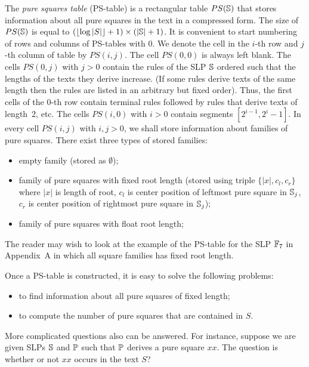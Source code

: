 ﻿\documentclass[11pt]{article}
\begin{document}
The \emph{pure squares table} (PS-table) is a rectangular table $PS(\mathbb{S})$ that stores information about all pure
squares in the text in a compressed form. The size of $PS(\mathbb{S})$ is equal to $(\lfloor\log |S|\rfloor+1) \times
(|\mathbb{S}|+1)$. It is convenient to start numbering of rows and columns of PS-tables with 0. We denote the cell in
the $i$-th row and $j$-th column of table by $PS(i,j)$. The cell $PS(0,0)$ is always left blank. The cells $PS(0,j)$
with $j>0$ contain the rules of the SLP $\mathbb{S}$ ordered such that the lengths of the texts they derive increase. (If some
rules derive texts of the same length then the rules are listed in an arbitrary but fixed order). Thus, the first cells 
of the 0-th row contain terminal rules followed by rules that derive texts of length~2, etc.  The cells $PS(i,0)$ with
$i>0$ contain segments $[2^{i-1}, 2^i - 1]$. In every cell $PS(i, j)$ with $i,j>0$, we shall store information about
families of pure squares. There exist three types of stored families:

\begin{itemize}
  \item empty family (stored as $\emptyset$);
  \item family of pure squares with fixed root length (stored using triple $\{|x|, c_l, c_r \}$ where $|x|$ is length
  of root, $c_l$ is center position of leftmost pure square in $\mathbb{S}_j$, $c_r$ is center position of rightmost pure
  square in $\mathbb{S}_j$);
  \item family of pure squares with float root length;
\end{itemize}

The reader may wish to look at the example of the PS-table for the SLP $\mathbb{F}_7$ in Appendix~A in which all square
families has fixed root length.

Once a PS-table is constructed, it is easy to solve the following problems:

\begin{itemize}
  \item to find information about all pure squares of fixed length;
  \item to compute the number of pure squares that are contained in $S$.
\end{itemize}

More complicated questions also can be answered. For instance, suppose we are given SLPs $\mathbb{S}$ and $\mathbb{P}$ such
that $\mathbb{P}$ derives a pure square $xx$. The question is whether or not $xx$ occurs in the text $S$?
\end{document}
